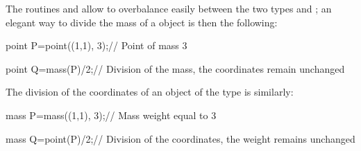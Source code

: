\documentclass[pdftex]{article}
\begin{document}
The routines  and
allow to overbalance easily between the two types   and
; an elegant way to divide the mass of a 
object is then the following:
\begin{Vcolor}
  point P=point((1,1), 3);// Point of mass 3

  point Q=mass(P)/2;// Division of the mass, the coordinates remain unchanged

\end{Vcolor}
The division of the coordinates of an object  of the type 
is similarly:
\begin{Vcolor}
  mass P=mass((1,1), 3);// Mass weight equal to 3

  mass Q=point(P)/2;// Division of the coordinates, the weight remains unchanged

\end{Vcolor}
\end{document}
